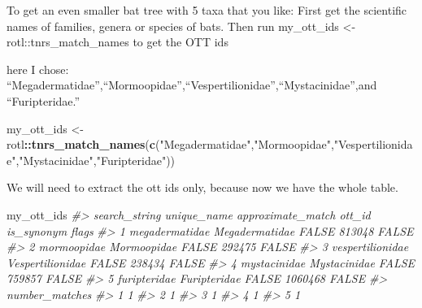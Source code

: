 \documentclass[]{article}
\newenvironment{Shaded}{\begin{snugshade}}{\end{snugshade}}
\newcommand{\CommentTok}[1]{\textcolor[rgb]{0.56,0.35,0.01}{\textit{#1}}}
\newcommand{\KeywordTok}[1]{\textcolor[rgb]{0.13,0.29,0.53}{\textbf{#1}}}
\newcommand{\NormalTok}[1]{#1}
\newcommand{\OperatorTok}[1]{\textcolor[rgb]{0.81,0.36,0.00}{\textbf{#1}}}
\newcommand{\StringTok}[1]{\textcolor[rgb]{0.31,0.60,0.02}{#1}}
\begin{document}
To get an even smaller bat tree with 5 taxa that you like: First get the
scientific names of families, genera or species of bats. Then run
my\_ott\_ids \textless{}- rotl::tnrs\_match\_names to get the OTT ids

here I chose:
``Megadermatidae'',``Mormoopidae'',``Vespertilionidae'',``Mystacinidae'',and
``Furipteridae.''

\begin{Shaded}
\begin{Highlighting}[]
\NormalTok{my_ott_ids <-}\StringTok{ }\NormalTok{rotl}\OperatorTok{::}\KeywordTok{tnrs_match_names}\NormalTok{(}\KeywordTok{c}\NormalTok{(}\StringTok{"Megadermatidae"}\NormalTok{,}\StringTok{"Mormoopidae"}\NormalTok{,}\StringTok{"Vespertilionidae"}\NormalTok{,}\StringTok{"Mystacinidae"}\NormalTok{,}\StringTok{"Furipteridae"}\NormalTok{))}
\end{Highlighting}
\end{Shaded}

We will need to extract the ott ids only, because now we have the whole
table.

\begin{Shaded}
\begin{Highlighting}[]
\NormalTok{my_ott_ids}
\CommentTok{#>      search_string      unique_name approximate_match  ott_id is_synonym flags}
\CommentTok{#> 1   megadermatidae   Megadermatidae             FALSE  813048      FALSE      }
\CommentTok{#> 2      mormoopidae      Mormoopidae             FALSE  292475      FALSE      }
\CommentTok{#> 3 vespertilionidae Vespertilionidae             FALSE  238434      FALSE      }
\CommentTok{#> 4     mystacinidae     Mystacinidae             FALSE  759857      FALSE      }
\CommentTok{#> 5     furipteridae     Furipteridae             FALSE 1060468      FALSE      }
\CommentTok{#>   number_matches}
\CommentTok{#> 1              1}
\CommentTok{#> 2              1}
\CommentTok{#> 3              1}
\CommentTok{#> 4              1}
\CommentTok{#> 5              1}
\end{Highlighting}
\end{Shaded}

\begin{Shaded}
\end{Shaded}
\end{document}
